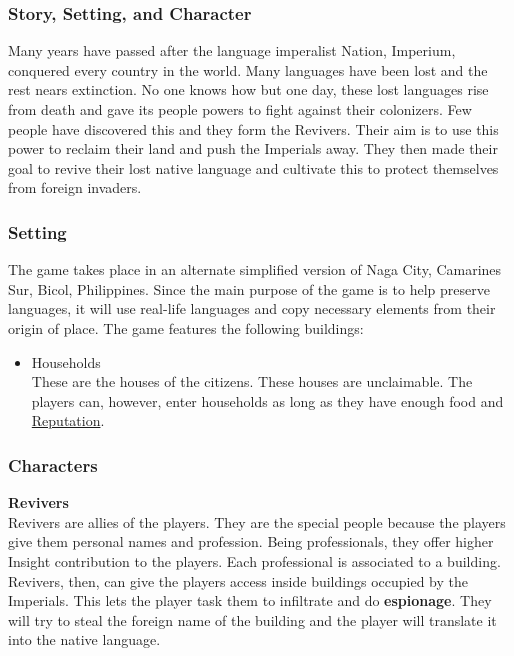 \documentclass[11pt]{article}
\begin{document}
\subsubsection{Story, Setting, and Character}
Many years have passed after the language imperalist Nation, Imperium, conquered every country in the world. Many languages have been lost and the rest nears extinction. No one knows how but one day, these lost languages rise from death and gave its people powers to fight against their colonizers. Few people have discovered this and they form the Revivers. Their aim is to use this power to reclaim their land and push the Imperials away. They then made their goal to revive their lost native language and cultivate this to protect themselves from foreign invaders. 

\subsubsection{Setting}
The game takes place in an alternate simplified version of Naga City, Camarines Sur, Bicol, Philippines. Since the main purpose of the game is to help preserve languages, it will use real-life languages and copy necessary elements from their origin of place. The game features the following buildings:
\begin{itemize}
\item
  Households\\
  These are the houses of the citizens. These houses are unclaimable. The players can, however, enter households as long as they have enough food and \hyperlink{reputation}{Reputation}.
\end{itemize}

\subsubsection{Characters}
\textbf{Revivers}\\
Revivers are allies of the players. They are the special people because the players give them personal names and profession. Being professionals, they offer higher Insight contribution to the players. Each professional is associated to a building. Revivers, then, can give the players access inside buildings occupied by the Imperials. This lets the player task them to infiltrate and do \textbf{espionage}. They will try to steal the foreign name of the building and the player will translate it into the native language.
\end{document}
